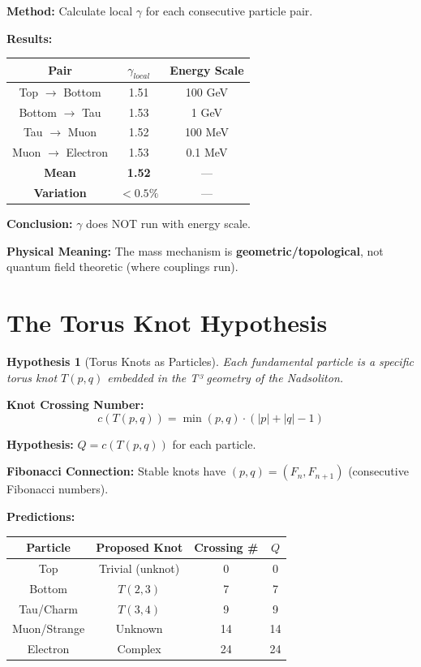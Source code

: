 \documentclass[11pt, a4paper]{article}
\newtheorem{hypothesis}{Hypothesis}[section]
\theoremstyle{remark}
\begin{document}
\textbf{Method:} Calculate local $\gamma$ for each consecutive particle pair.

\textbf{Results:}
\begin{center}
\begin{tabular}{|c|c|c|}
\hline
\textbf{Pair} & $\gamma_{local}$ & \textbf{Energy Scale} \\
\hline
Top $\to$ Bottom & 1.51 & 100 GeV \\
Bottom $\to$ Tau & 1.53 & 1 GeV \\
Tau $\to$ Muon & 1.52 & 100 MeV \\
Muon $\to$ Electron & 1.53 & 0.1 MeV \\
\hline
\textbf{Mean} & \textbf{1.52} & --- \\
\textbf{Variation} & $< 0.5\%$ & --- \\
\hline
\end{tabular}
\end{center}

\textbf{Conclusion:} $\gamma$ does NOT run with energy scale.

\textbf{Physical Meaning:} The mass mechanism is \textbf{geometric/topological}, not quantum field theoretic (where couplings run).

\section{The Torus Knot Hypothesis}

\begin{hypothesis}[Torus Knots as Particles]
Each fundamental particle is a specific torus knot $T(p,q)$ embedded in the T³ geometry of the Nadsoliton.
\end{hypothesis}

\textbf{Knot Crossing Number:}
\begin{equation}
c(T(p,q)) = \min(p,q) \cdot (|p| + |q| - 1)
\end{equation}

\textbf{Hypothesis:} $Q = c(T(p,q))$ for each particle.

\textbf{Fibonacci Connection:} Stable knots have $(p,q) = (F_n, F_{n+1})$ (consecutive Fibonacci numbers).

\textbf{Predictions:}
\begin{center}
\begin{tabular}{|c|c|c|c|}
\hline
\textbf{Particle} & \textbf{Proposed Knot} & \textbf{Crossing \#} & \textbf{$Q$} \\
\hline
Top & Trivial (unknot) & 0 & 0 \\
Bottom & $T(2,3)$ & 7 & 7 \\
Tau/Charm & $T(3,4)$ & 9 & 9 \\
Muon/Strange & Unknown & 14 & 14 \\
Electron & Complex & 24 & 24 \\
\hline
\end{tabular}
\end{center}
\end{document}
